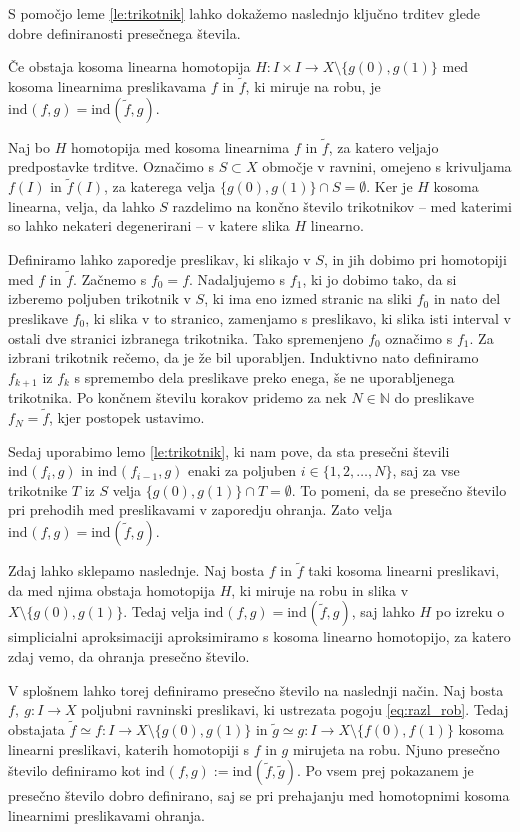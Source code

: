 \documentclass[mat1]{fmfdelo}
\newcommand{\N}{\mathbb N}
\newcommand{\ind}[3][]{\text{ind}_{#1}(#2, #3)}
\begin{document}
S pomočjo leme \ref{le:trikotnik} lahko dokažemo naslednjo ključno trditev glede dobre definiranosti presečnega števila.
\begin{trditev}
Če obstaja kosoma linearna homotopija $H\colon I \times I \to X \setminus \{g(0), g(1)\}$ med kosoma linearnima preslikavama $f$ in $\widetilde{f}$, ki miruje na robu, je $\ind{f}{g} = \ind{\widetilde{f}}{g}$.
\end{trditev}
\proof
Naj bo $H$ homotopija med kosoma linearnima $f$ in $\widetilde{f}$, za katero veljajo predpostavke trditve. Označimo s $S\subset X$ območje v ravnini, omejeno s krivuljama $f(I)$ in $\widetilde{f}(I)$, za katerega velja $\{g(0), g(1)\} \cap S = \emptyset$. Ker je $H$ kosoma linearna, velja, da lahko $S$ razdelimo na končno število trikotnikov -- med katerimi so lahko nekateri degenerirani -- v katere slika $H$ linearno. 

Definiramo lahko zaporedje preslikav, ki slikajo v $S$, in jih dobimo pri homotopiji med $f$ in $\widetilde{f}$. Začnemo s $f_0 = f$. Nadaljujemo s $f_1$, ki jo dobimo tako, da si izberemo poljuben trikotnik v $S$, ki ima eno izmed stranic na sliki $f_0$ in nato del preslikave $f_0$, ki slika v to stranico, zamenjamo s preslikavo, ki slika isti interval v ostali dve stranici izbranega trikotnika. Tako spremenjeno $f_0$ označimo s $f_1$. Za izbrani trikotnik rečemo, da je že bil uporabljen. Induktivno nato definiramo $f_{k+1}$ iz $f_k$ s spremembo dela preslikave preko enega, še ne uporabljenega trikotnika. Po končnem številu korakov pridemo za nek $N \in \N$ do preslikave $f_N = \widetilde{f}$, kjer postopek ustavimo.

Sedaj uporabimo lemo \ref{le:trikotnik}, ki nam pove, da sta presečni števili $\ind{f_i}{g}$ in $\ind{f_{i-1}}{g}$ enaki za poljuben $i\in \{1, 2, \ldots , N\}$, saj za vse trikotnike $T$ iz $S$ velja $\{g(0), g(1) \} \cap T = \emptyset$. To pomeni, da se presečno število pri prehodih med preslikavami v zaporedju ohranja. Zato velja $\ind{f}{g} = \ind{\widetilde{f}}{g}$.
\endproof

Zdaj lahko sklepamo naslednje. Naj bosta $f$ in $\widetilde{f}$ taki kosoma linearni preslikavi, da med njima obstaja homotopija $H$, ki miruje na robu in slika v $X \setminus \{ g(0), g(1)\}$. Tedaj velja $\ind{f}{g} = \ind{\widetilde{f}}{g}$, saj lahko $H$ po izreku o simplicialni aproksimaciji aproksimiramo s kosoma linearno homotopijo, za katero zdaj vemo, da ohranja presečno število. 

V splošnem lahko torej definiramo presečno število na naslednji način. Naj bosta $f,\ g\colon I \to X$ poljubni ravninski preslikavi, ki ustrezata pogoju \eqref{eq:razl_rob}. Tedaj obstajata $\widetilde{f} \simeq f\colon I \to X \setminus \{g(0), g(1)\}$ in $\widetilde{g} \simeq g\colon I \to X \setminus \{f(0), f(1)\}$ kosoma linearni preslikavi, katerih homotopiji s $f$ in $g$ mirujeta na robu. Njuno presečno število definiramo kot $\ind{f}{g} := \ind{\widetilde{f}}{\widetilde{g}}$. Po vsem prej pokazanem je presečno število dobro definirano, saj se pri prehajanju med homotopnimi kosoma linearnimi preslikavami ohranja.
\end{document}
